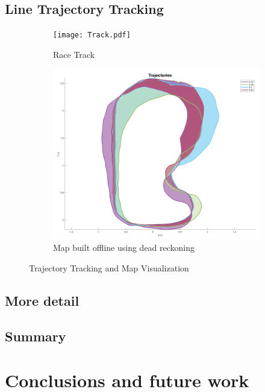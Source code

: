     \subsection{Line Trajectory Tracking}
    \begin{figure}[H]
        \centering
        \begin{subfigure}[c]{0.35\textwidth}
            \texttt{[image: Track.pdf]}
            \caption{Race Track}
        \end{subfigure}
        \hfill
        \begin{subfigure}[c]{0.6\textwidth}
            \includegraphics[width=1.2\textwidth]{Graphs/DeadReckoningTrackMap.png}

            \caption{Map built offline using dead reckoning}
        \end{subfigure}
        \caption{Trajectory Tracking and Map Visualization}
        \label{fig:TrajTrack}
    \end{figure}
    \subsection{More detail}
    \subsection{Summary}
  \section{Conclusions and future work} %
